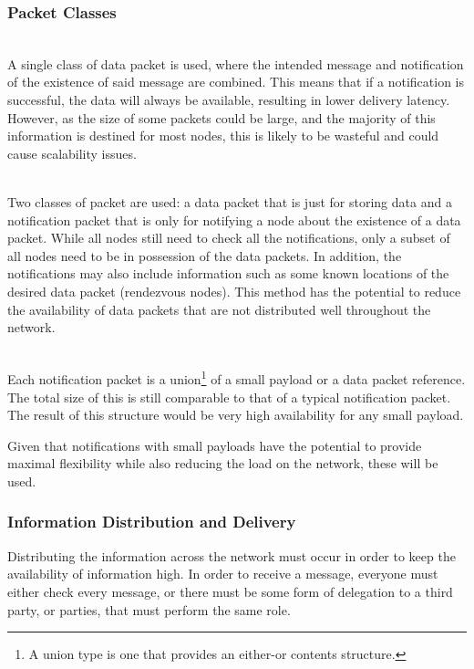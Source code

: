 		\subsubsection{Packet Classes}
			\begin{description}[topsep=-5pt,itemsep=-1ex,partopsep=2ex,parsep=1.5ex]
				\item[Data as Notifications] \hfill \\
				A single class of data packet is used, where the intended message and notification of the existence of said message are combined. This means that if a notification is successful, the data will always be available, resulting in lower delivery latency. However, as the size of some packets could be large, and the majority of this information is destined for most nodes, this is likely to be wasteful and could cause scalability issues.
				\item[Notifications Referencing Data] \hfill \\
				Two classes of packet are used: a data packet that is just for storing data and a notification packet that is only for notifying a node about the existence of a data packet. While all nodes still need to check all the notifications, only a subset of all nodes need to be in possession of the data packets. In addition, the notifications may also include information such as some known locations of the desired data packet (rendezvous nodes). This method has the potential to reduce the availability of data packets that are not distributed well throughout the network.
				\item[Notifications with Small Payload] \hfill \\
				Each notification packet is a union\footnote{A union type is one that provides an either-or contents structure.} of a small payload or a data packet reference. The total size of this is still comparable to that of a typical notification packet. The result of this structure would be very high availability for any small payload.
			\end{description}
			Given that notifications with small payloads have the potential to provide maximal flexibility while also reducing the load on the network, these will be used.
			
		\subsubsection{Information Distribution and Delivery}
			Distributing the information across the network must occur in order to keep the availability of information high. In order to receive a message, everyone must either check every message, or there must be some form of delegation to a third party, or parties, that must perform the same role.
			
